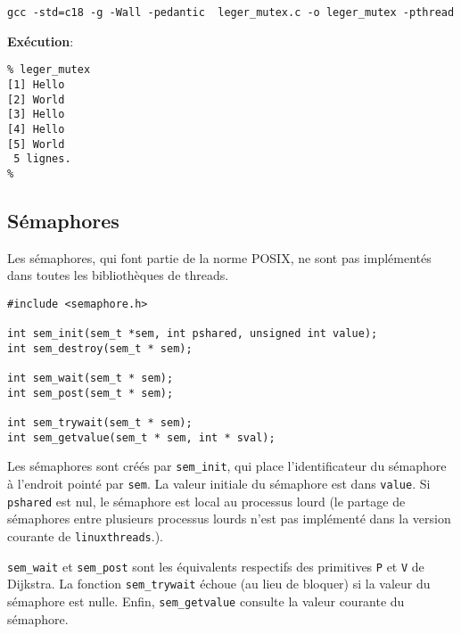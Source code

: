 


\extrait
\begin{lstlisting}
gcc -std=c18 -g -Wall -pedantic  leger_mutex.c -o leger_mutex -pthread
\end{lstlisting}


\textbf{Exécution}:

\extrait
\begin{lstlisting}
% leger_mutex 
[1] Hello
[2] World
[3] Hello
[4] Hello
[5] World
 5 lignes.
%
\end{lstlisting}



\subsection{Sémaphores}


Les sémaphores, qui font partie de la norme POSIX,
ne sont pas implémentés 
dans toutes les bibliothèques de threads.



\extrait
\begin{lstlisting}
#include <semaphore.h>

int sem_init(sem_t *sem, int pshared, unsigned int value);
int sem_destroy(sem_t * sem);

int sem_wait(sem_t * sem);
int sem_post(sem_t * sem);

int sem_trywait(sem_t * sem);
int sem_getvalue(sem_t * sem, int * sval);
\end{lstlisting}


Les sémaphores sont créés par \texttt{sem\_init}, qui place
l'identificateur du sémaphore à l'endroit pointé par \texttt{sem}. La
valeur initiale du sémaphore est dans \texttt{value}. Si
\texttt{pshared} est nul, le sémaphore est local au processus lourd
(le partage de sémaphores entre plusieurs processus lourds n'est pas
implémenté dans la version courante de \texttt{linuxthreads}.).



\texttt{sem\_wait} et \texttt{sem\_post} sont les équivalents respectifs
des primitives \texttt{P} et \texttt{V} de Dijkstra. La fonction
\texttt{sem\_trywait} échoue (au lieu de bloquer) si la valeur du
sémaphore est nulle. Enfin, \texttt{sem\_getvalue} consulte la valeur
courante du sémaphore.





